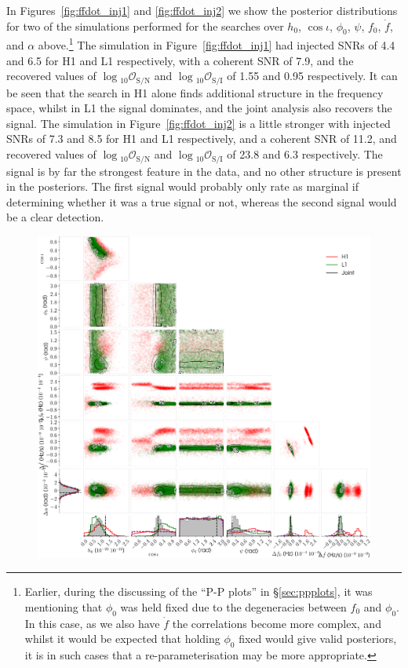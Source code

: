 In Figures~\ref{fig:ffdot_inj1} and \ref{fig:ffdot_inj2} we show the posterior distributions for two of the simulations performed for the searches over
$h_0$, $\cos{\iota}$, $\phi_0$, $\psi$, $f_0$, $\dot{f}$, and $\alpha$ above.\footnote{Earlier, during the discussing of the ``P-P plots'' in \S\ref{sec:ppplots},
it was mentioning that $\phi_0$ was held fixed due to the degeneracies between $f_0$ and $\phi_0$. In this case, as we also have $\dot{f}$ the correlations
become more complex, and whilst it would be expected that holding $\phi_0$ fixed would give valid posteriors, it is in such cases that a re-parameterisation
may be more appropriate.} The simulation in Figure~\ref{fig:ffdot_inj1} had injected SNRs of 4.4 and 6.5 for H1
and L1 respectively, with a coherent SNR of 7.9, and the recovered values of $\log{}_{10}\mathcal{O}_{\text{S}/\text{N}}$ and
$\log{}_{10}\mathcal{O}_{\text{S}/\text{I}}$ of 1.55 and 0.95 respectively. It can be seen that the search in H1 alone finds additional structure
in the frequency space, whilst in L1 the signal dominates, and the joint analysis also recovers the signal. The simulation in Figure~\ref{fig:ffdot_inj2}
is a little stronger with injected SNRs of 7.3 and 8.5 for H1 and L1 respectively, and a coherent SNR of 11.2, and recovered values of 
$\log{}_{10}\mathcal{O}_{\text{S}/\text{N}}$ and $\log{}_{10}\mathcal{O}_{\text{S}/\text{I}}$ of 23.8 and 6.3 respectively. The signal is by far the strongest
feature in the data, and no other structure is present in the posteriors. The first signal would probably only rate as marginal if determining whether it was
a true signal or not, whereas the second signal would be a clear detection.

\begin{figure}[!phtb]
\begin{center}
\includegraphics[width=1\columnwidth]{./figures/codeeval/simulations/signal_freq/one/ffdot_inj1}
\caption{ \protect}
\end{center}
\end{figure}


